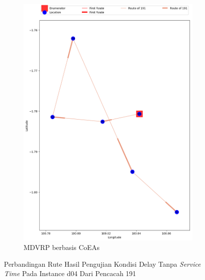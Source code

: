 \begin{figure}[H]
	\centering
	\begin{subfigure}[t]{\textwidth}
		\centering
		\includegraphics[width=\textwidth]{Resources/Images/delayed_5/real_m15_n100_delayed_5_191_coes}
		\caption{MDVRP berbasis CoEAs}
		\label{fig:real_m15_n100_delayed_5_191_coes}
	\end{subfigure}
	\caption{Perbandingan Rute Hasil Pengujian Kondisi Delay Tanpa \textit{Service Time} Pada Instance d04 Dari Pencacah 191}
	\label{fig:real_m15_n100_delayed_5_191}
\end{figure}


